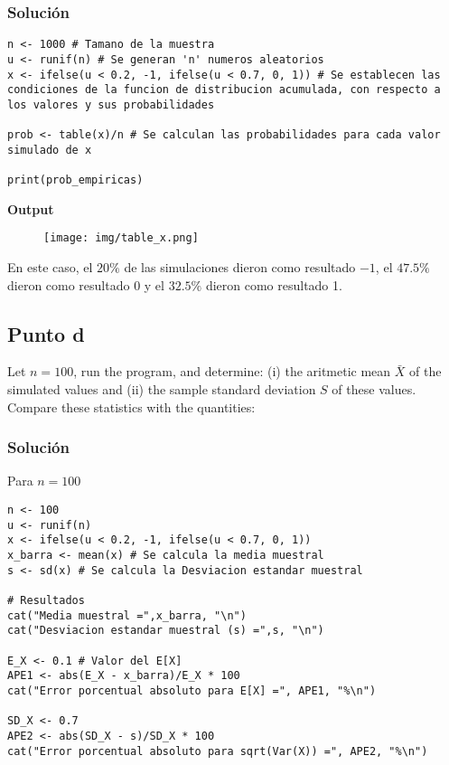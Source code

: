 \documentclass[12pt]{article}
\begin{document}
\subsubsection{Solución}


\begin{lstlisting}
n <- 1000 # Tamano de la muestra
u <- runif(n) # Se generan 'n' numeros aleatorios
x <- ifelse(u < 0.2, -1, ifelse(u < 0.7, 0, 1)) # Se establecen las condiciones de la funcion de distribucion acumulada, con respecto a los valores y sus probabilidades

prob <- table(x)/n # Se calculan las probabilidades para cada valor simulado de x

print(prob_empiricas)
\end{lstlisting}


\textbf{Output}


\begin{figure}[h]
    \centering
    \texttt{[image: img/table\_x.png]}
\end{figure}

En este caso, el $20\%$ de las simulaciones dieron como resultado $-1$, el $47.5\%$ dieron como resultado 0 y el $32.5\%$ dieron como resultado 1.



\subsection{Punto d}

Let $n = 100$, run the program, and determine: (i) the aritmetic mean $\bar{X}$ of the simulated values and (ii) the sample standard deviation $S$ of these values. Compare these statistics with the quantities:

\subsubsection{Solución}

Para $n=100$


\begin{lstlisting}
n <- 100 
u <- runif(n)
x <- ifelse(u < 0.2, -1, ifelse(u < 0.7, 0, 1)) 
x_barra <- mean(x) # Se calcula la media muestral
s <- sd(x) # Se calcula la Desviacion estandar muestral

# Resultados
cat("Media muestral =",x_barra, "\n")
cat("Desviacion estandar muestral (s) =",s, "\n")

E_X <- 0.1 # Valor del E[X]
APE1 <- abs(E_X - x_barra)/E_X * 100
cat("Error porcentual absoluto para E[X] =", APE1, "%\n")

SD_X <- 0.7
APE2 <- abs(SD_X - s)/SD_X * 100
cat("Error porcentual absoluto para sqrt(Var(X)) =", APE2, "%\n")
\end{lstlisting}
\end{document}
